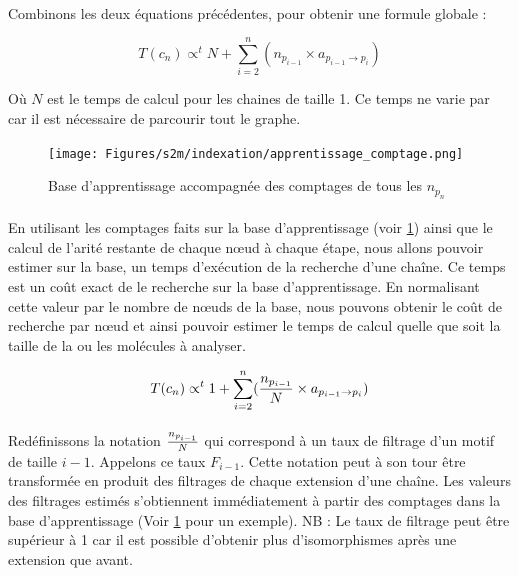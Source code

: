 \documentclass[12pt,french,twoside]{report}
\begin{document}
\paragraph{}Combinons les deux équations précédentes, pour obtenir une formule globale :

\begin{equation}
 T(c_n) \propto^t N + \sum_{i=2}^n (n_{p_{i-1}} \times a_{p_{i-1} \rightarrow p_i})
\end{equation}

Où $N$ est le temps de calcul pour les chaines de taille 1.
Ce temps ne varie par car il est nécessaire de parcourir tout le graphe.

\begin{figure}[!ht]
  \begin{center}
    \texttt{[image: Figures/s2m/indexation/apprentissage\_comptage.png]}
    \caption{\label{app_compt}Base d'apprentissage accompagnée des comptages de tous les $n_{p_{n}}$}
  \end{center}
\end{figure}

\paragraph{}En utilisant les comptages faits sur la base d'apprentissage (voir \ref{app_compt}) ainsi que le calcul de l'arité
restante de chaque n\oe{}ud à chaque étape, nous allons pouvoir estimer sur la base, un temps d'exécution de la recherche d'une
chaîne. Ce temps est un coût exact de le recherche sur la base d'apprentissage. En normalisant cette valeur par le nombre de
n\oe{}uds de la base, nous pouvons obtenir le coût de recherche par n\oe{}ud et ainsi pouvoir estimer le temps de calcul quelle que soit
la taille de la ou les molécules à analyser.

\begin{equation}
 T(c_n) \propto^t 1 + \sum_{i=2}^n ({n_{p_{i-1}} \over N} \times a_{p_{i-1} \rightarrow p_i})
\end{equation}

\paragraph{}Redéfinissons la notation ${n_{p_{i-1}} \over N}$ qui correspond à un taux de filtrage d'un motif de taille $i-1$.
Appelons ce taux $F_{i-1}$. Cette notation peut à son tour être transformée en
produit des filtrages de chaque extension d'une chaîne. Les valeurs des filtrages estimés s'obtiennent immédiatement à partir des
comptages dans la base d'apprentissage (Voir \ref{app_compt} pour un exemple). NB : Le taux de filtrage peut être supérieur à 1
car il est possible d'obtenir plus d'isomorphismes après une extension que avant.
\end{document}
